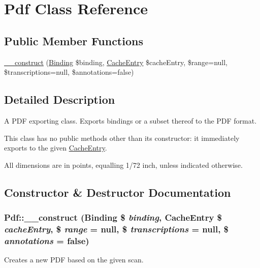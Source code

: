 \hypertarget{classPdf}{
\section{Pdf Class Reference}
\label{classPdf}
}
\subsection*{Public Member Functions}
\begin{DoxyCompactItemize}
\item 
\hyperlink{classPdf_acb8895ccd91e9ee8ca483c719626e89a}{\_\-\_\-construct} (\hyperlink{classBinding}{Binding} \$binding, \hyperlink{classCacheEntry}{CacheEntry} \$cacheEntry, \$range=null, \$transcriptions=null, \$annotations=false)
\end{DoxyCompactItemize}


\subsection{Detailed Description}
A PDF exporting class. Exports bindings or a subset thereof to the PDF format.

This class has no public methods other than its constructor: it immediately exports to the given \hyperlink{classCacheEntry}{CacheEntry}.

All dimensions are in points, equalling 1/72 inch, unless indicated otherwise. 

\subsection{Constructor \& Destructor Documentation}
\hypertarget{classPdf_acb8895ccd91e9ee8ca483c719626e89a}{
\subsubsection[{\_\-\_\-construct}]{\setlength{\rightskip}{0pt plus 5cm}Pdf::\_\-\_\-construct ({\bf Binding} \$ {\em binding}, \/  {\bf CacheEntry} \$ {\em cacheEntry}, \/  \$ {\em range} = {\ttfamily null}, \/  \$ {\em transcriptions} = {\ttfamily null}, \/  \$ {\em annotations} = {\ttfamily false})}}
\label{classPdf_acb8895ccd91e9ee8ca483c719626e89a}
Creates a new PDF based on the given scan.


